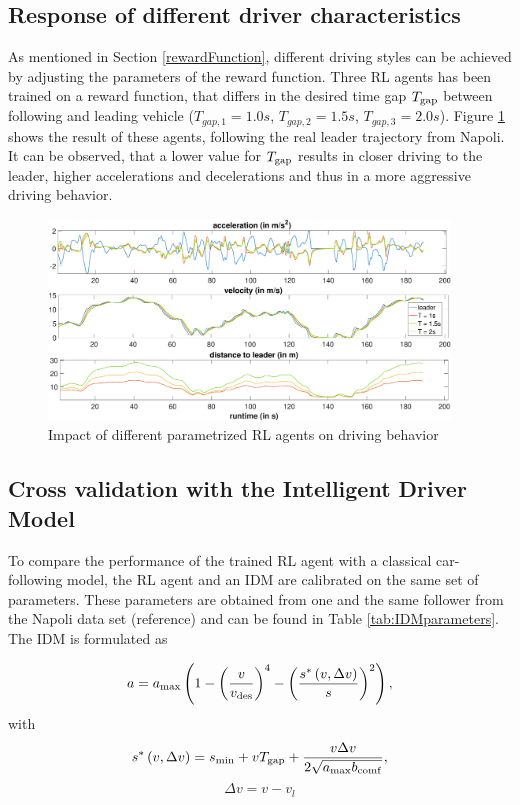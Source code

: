 \documentclass[review]{elsarticle}
\providecommand{\3}{{\ss}}
\begin{document}
\subsection{Response of different driver characteristics}
\label{sec:differentT}

As mentioned in Section \ref{rewardFunction}, different driving styles can be achieved by adjusting the parameters of the reward function. Three RL agents has been trained on a reward function, that differs in the desired time gap $T_{\rm gap}$ between following and leading vehicle ($T_{gap,1} = 1.0s$, $T_{gap,2} = 1.5s$, $T_{gap,3} = 2.0s$). Figure \ref{fig:differentT} shows the result of these agents, following the real leader trajectory from Napoli. It can be observed, that a lower value for $T_{\rm gap}$ results in closer driving to the leader, higher accelerations and decelerations and thus in a more aggressive driving behavior. 

\begin{figure}
	\centering
	\includegraphics[width=0.95\textwidth]{images/differentT}
	\caption{Impact of different parametrized RL agents on driving behavior}
	\label{fig:differentT}
\end{figure}


\subsection{Cross validation with the Intelligent Driver Model}
To compare the performance of the trained RL agent with a classical car-following model, the RL agent and an IDM are calibrated on the same set of parameters. These parameters are obtained from one and the same follower from the Napoli data set (reference) and can be found in Table \ref{tab:IDMparameters}. The IDM is formulated as 

\begin{equation}
a=a_{\rm max}\left(1-\left(\frac{v}{v_{\rm des}}\right)^{4}-\left(\frac{s^{*}\left(v, \Delta v\right)}{s}\right)^{2}\right),
\end{equation}
with
\begin{equation}
s^{*}\left(v, \Delta v\right)=s_{\rm min}+vT_{\rm gap}+\frac{v \Delta v}{2 \sqrt{a_{\rm max} b_{\rm comf}}},
\end{equation}
\begin{equation}
\Delta v = v-v_l
\end{equation}
\end{document}
